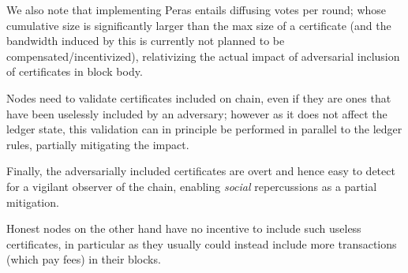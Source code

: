 We also note that implementing Peras entails diffusing \perasN{} votes per round; whose cumulative size  is significantly larger than the max size of a certificate (and the bandwidth induced by this is currently not planned to be compensated/incentivized), relativizing the actual impact of adversarial inclusion of certificates in block body.

Nodes need to validate certificates included on chain, even if they are ones that have been uselessly included by an adversary; however as it does not affect the ledger state, this validation can in principle be performed in parallel to the ledger rules, partially mitigating the impact.

Finally, the adversarially included certificates are overt and hence easy to detect for a vigilant observer of the chain, enabling \emph{social} repercussions as a partial mitigation.

Honest nodes on the other hand have no incentive to include such useless certificates, in particular as they usually could instead include more transactions (which pay fees) in their blocks.





